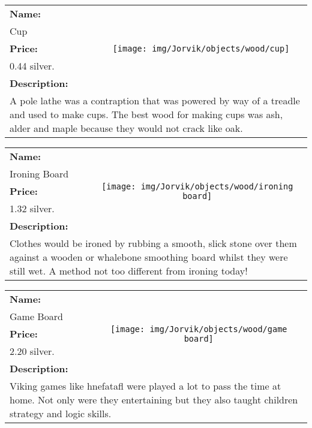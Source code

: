 \begin{table}[ht!]
	\centering
	\begin{tabular}{ p{3cm} c }\toprule
		\textbf{Name:} & \multirow{5}{*}{\texttt{[image: img/Jorvik/objects/wood/cup]}}\\
		Cup & \\ 
		\textbf{Price:} & \\
		0.44 silver. & \\ 
		\textbf{Description:} & \\
		\multicolumn{2}{p{12cm}}{A pole lathe was a contraption that was powered by way of a treadle and used to make cups. The best wood for making cups was ash, alder and maple because they would not crack like oak.}\\
		\bottomrule
	\end{tabular}
\end{table}

\begin{table}[ht!]
	\centering
	\begin{tabular}{ p{3cm} c }\toprule
		\textbf{Name:} & \multirow{5}{*}{\texttt{[image: img/Jorvik/objects/wood/ironing board]}}\\
		Ironing Board & \\ 
		\textbf{Price:} & \\
		1.32 silver. & \\ 
		\textbf{Description:} & \\
		\multicolumn{2}{p{12cm}}{Clothes would be ironed by rubbing a smooth, slick stone over them against a wooden or whalebone smoothing board whilst they were still wet. A method not too different from ironing today!}\\
		\bottomrule
	\end{tabular}
\end{table}

\begin{table}[ht!]
	\centering
	\begin{tabular}{ p{3cm} c }\toprule
		\textbf{Name:} & \multirow{5}{*}{\texttt{[image: img/Jorvik/objects/wood/game board]}}\\
		Game Board & \\ 
		\textbf{Price:} & \\
		2.20 silver. & \\ 
		\textbf{Description:} & \\
		\multicolumn{2}{p{12cm}}{Viking games like hnefatafl were played a lot to pass the time at home. Not only were they entertaining but they also taught children strategy and logic skills.}\\
		\bottomrule
	\end{tabular}
\end{table}

